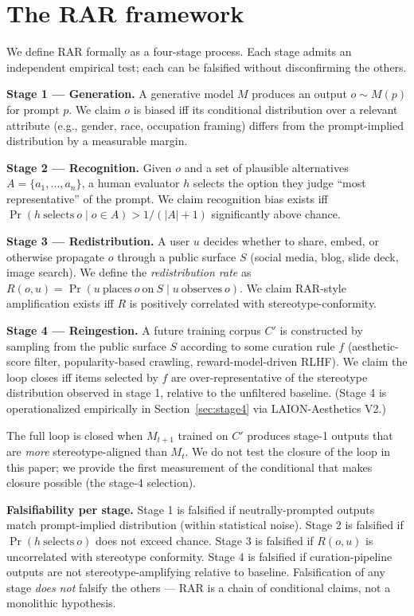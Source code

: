 \documentclass[sigconf,nonacm]{acmart}
\begin{document}
\section{The RAR framework}

We define RAR formally as a four-stage process. Each stage admits an independent empirical test; each can be falsified without disconfirming the others.

\textbf{Stage 1 --- Generation.} A generative model \(M\) produces an output \(o \sim M(p)\) for prompt \(p\). We claim \(o\) is biased iff its conditional distribution over a relevant attribute (e.g., gender, race, occupation framing) differs from the prompt-implied distribution by a measurable margin.

\textbf{Stage 2 --- Recognition.} Given \(o\) and a set of plausible alternatives \(A = \{a_1, \dots, a_n\}\), a human evaluator \(h\) selects the option they judge ``most representative'' of the prompt. We claim recognition bias exists iff \(\Pr(h\ \text{selects}\ o \mid o \in A) > 1/(|A|+1)\) significantly above chance.

\textbf{Stage 3 --- Redistribution.} A user \(u\) decides whether to share, embed, or otherwise propagate \(o\) through a public surface \(S\) (social media, blog, slide deck, image search). We define the \emph{redistribution rate} as \(R(o, u) = \Pr(u\ \text{places}\ o\ \text{on}\ S \mid u\ \text{observes}\ o)\). We claim RAR-style amplification exists iff \(R\) is positively correlated with stereotype-conformity.

\textbf{Stage 4 --- Reingestion.} A future training corpus \(C'\) is constructed by sampling from the public surface \(S\) according to some curation rule \(f\) (aesthetic-score filter, popularity-based crawling, reward-model-driven RLHF). We claim the loop closes iff items selected by \(f\) are over-representative of the stereotype distribution observed in stage 1, relative to the unfiltered baseline. (Stage 4 is operationalized empirically in Section~\ref{sec:stage4} via LAION-Aesthetics V2.)

The full loop is closed when \(M_{t+1}\) trained on \(C'\) produces stage-1 outputs that are \emph{more} stereotype-aligned than \(M_t\). We do not test the closure of the loop in this paper; we provide the first measurement of the conditional that makes closure possible (the stage-4 selection).

\textbf{Falsifiability per stage.} Stage 1 is falsified if neutrally-prompted outputs match prompt-implied distribution (within statistical noise). Stage 2 is falsified if \(\Pr(h\ \text{selects}\ o)\) does not exceed chance. Stage 3 is falsified if \(R(o,u)\) is uncorrelated with stereotype conformity. Stage 4 is falsified if curation-pipeline outputs are not stereotype-amplifying relative to baseline. Falsification of any stage \emph{does not} falsify the others --- RAR is a chain of conditional claims, not a monolithic hypothesis.
\end{document}
